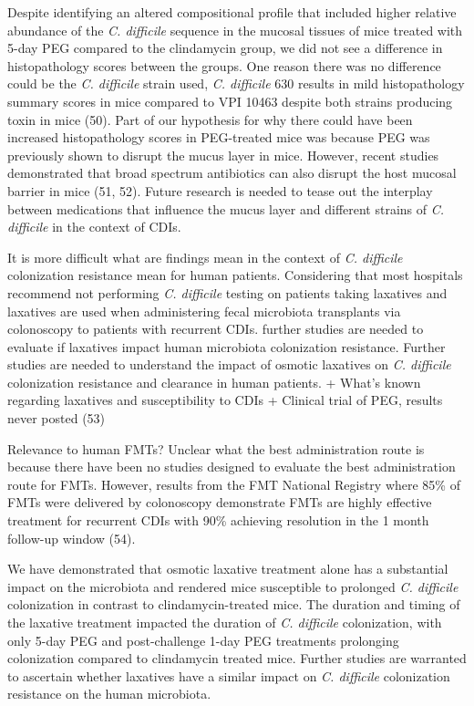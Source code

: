\documentclass[
  11pt,
]{article}
\begin{document}
Despite identifying an altered compositional profile that included
higher relative abundance of the \emph{C. difficile} sequence in the
mucosal tissues of mice treated with 5-day PEG compared to the
clindamycin group, we did not see a difference in histopathology scores
between the groups. One reason there was no difference could be the
\emph{C. difficile} strain used, \emph{C. difficile} 630 results in mild
histopathology summary scores in mice compared to VPI 10463 despite both
strains producing toxin in mice (50). Part of our hypothesis for why
there could have been increased histopathology scores in PEG-treated
mice was because PEG was previously shown to disrupt the mucus layer in
mice. However, recent studies demonstrated that broad spectrum
antibiotics can also disrupt the host mucosal barrier in mice (51, 52).
Future research is needed to tease out the interplay between medications
that influence the mucus layer and different strains of \emph{C.
difficile} in the context of CDIs.

It is more difficult what are findings mean in the context of \emph{C.
difficile} colonization resistance mean for human patients. Considering
that most hospitals recommend not performing \emph{C. difficile} testing
on patients taking laxatives and laxatives are used when administering
fecal microbiota transplants via colonoscopy to patients with recurrent
CDIs. further studies are needed to evaluate if laxatives impact human
microbiota colonization resistance. Further studies are needed to
understand the impact of osmotic laxatives on \emph{C. difficile}
colonization resistance and clearance in human patients. + What's known
regarding laxatives and susceptibility to CDIs + Clinical trial of PEG,
results never posted (53)

Relevance to human FMTs? Unclear what the best administration route is
because there have been no studies designed to evaluate the best
administration route for FMTs. However, results from the FMT National
Registry where 85\% of FMTs were delivered by colonoscopy demonstrate
FMTs are highly effective treatment for recurrent CDIs with 90\%
achieving resolution in the 1 month follow-up window (54).

We have demonstrated that osmotic laxative treatment alone has a
substantial impact on the microbiota and rendered mice susceptible to
prolonged \emph{C. difficile} colonization in contrast to
clindamycin-treated mice. The duration and timing of the laxative
treatment impacted the duration of \emph{C. difficile} colonization,
with only 5-day PEG and post-challenge 1-day PEG treatments prolonging
colonization compared to clindamycin treated mice. Further studies are
warranted to ascertain whether laxatives have a similar impact on
\emph{C. difficile} colonization resistance on the human microbiota.
\end{document}
